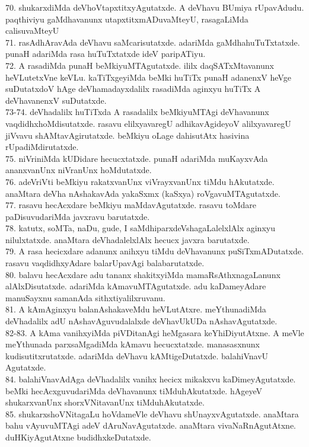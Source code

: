 \documentclass{article}
\begin{document}
70. shukarxdiMda deVhoVtapxtitxyAgutatxde. A deVhavu BUmiya rUpavAdudu. paqthiviyu gaMdhavanunx utapxtitxmADuvaMteyU, rasagaLiMda calisuvaMteyU\\
71. rasAdhAravAda deVhavu saMcarisutatxde. adariMda gaMdhahuTuTxtatxde. punaH adariMda rasa huTuTxtatxde ideV paripATiyu.\\
72. A rasadiMda punaH beMkiyuMTAgutatxde. ililx daqSATxMtavanunx heVLutetxVne keVLu. kaTiTxgeyiMda beMki huTiTx punaH adanenxV heVge suDutatxdoV hAge deVhamadayxdalilx rasadiMda aginxyu huTiTx A deVhavanenxV suDutatxde.\\
73-74. deVhadalilx huTiTxda A rasadalilx beMkiyuMTAgi deVhavanunx vaqdidhxhoMdisutatxde. rasavu elilxyavaregU adhikavAgideyoV alilxyavaregU jiVvavu shAMtavAgirutatxde. beMkiyu oLage dahisutAtx hasivina rUpadiMdirutatxde.\\
75. niVriniMda kUDidare hecucxtatxde. punaH adariMda muKayxvAda ananxvanUnx niVranUnx hoMdutatxde.\\
76. adeVriVti beMkiyu rakatxvanUnx viVrayxvanUnx tiMdu hAkutatxde. anaMtara deVha nAshakavAda yakaSxmx (kaSxya) roVgavuMTAgutatxde.\\
77. rasavu hecAcxdare beMkiyu maMdavAgutatxde. rasavu toMdare paDisuvudariMda javxravu barutatxde.\\
78. katutx, soMTa, naDu, gude, I saMdhiparxdeVshagaLalelxlAlx aginxyu nilulxtatxde. anaMtara deVhadalelxlAlx hecucx javxra barutatxde.\\
79. A rasa hecicxdare adanunx anihxyu tiMdu deVhavanunx puSiTxmADutatxde. rasavu vaqdidhxyAdare balarUpavAgi balabarutatxde.\\
80. balavu hecAcxdare adu tananx shakitxyiMda mamaRsAthxnagaLanunx alAlxDisutatxde. adariMda kAmavuMTAgutatxde. adu kaDameyAdare manuSayxnu samanAda sithxtiyalilxruvanu.\\
81. A kAmAginxyu balanAshakaveMdu heVLutAtxre. meYthunadiMda deVhadalilx adU nAshavAguvudalalxde deVhavUkUDa nAshavAgutatxde.\\
82-83. A kAma vanihxyiMda piVDitanAgi heMgasara keYhiDiyutAtxne. A meVle meYthunada parxsaMgadiMda kAmavu hecucxtatxde. manasasxnunx kudisutitxrutatxde. adariMda deVhavu kAMtigeDutatxde. balahiVnavU Agutatxde.\\
84. balahiVnavAdAga deVhadalilx vanihx hecicx mikakxvu kaDimeyAgutatxde. beMki hecAcxguvudariMda deVhavanunx tiMduhAkutatxde. hAgeyeV shukarxvanUnx shorxVNitavanUnx tiMduhAkutatxde.\\
85. shukarxshoVNitagaLu hoVdameVle deVhavu shUnayxvAgutatxde. anaMtara bahu vAyuvuMTAgi adeV dAruNavAgutatxde. anaMtara vivaNaRnAgutAtxne. duHKiyAgutAtxne budidhxkeDutatxde.\\
\end{document}

